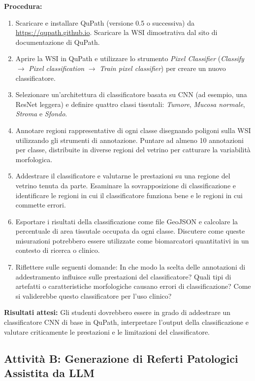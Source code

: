 \textbf{Procedura:}
\begin{enumerate}
  \item Scaricare e installare QuPath (versione 0.5 o successiva) da \url{https://qupath.github.io}. Scaricare la WSI dimostrativa dal sito di documentazione di QuPath.
  \item Aprire la WSI in QuPath e utilizzare lo strumento \textit{Pixel Classifier} (\textit{Classify} $\rightarrow$ \textit{Pixel classification} $\rightarrow$ \textit{Train pixel classifier}) per creare un nuovo classificatore.
  \item Selezionare un'architettura di classificatore basata su CNN (ad esempio, una ResNet leggera) e definire quattro classi tissutali: \textit{Tumore}, \textit{Mucosa normale}, \textit{Stroma} e \textit{Sfondo}.
  \item Annotare regioni rappresentative di ogni classe disegnando poligoni sulla WSI utilizzando gli strumenti di annotazione. Puntare ad almeno 10 annotazioni per classe, distribuite in diverse regioni del vetrino per catturare la variabilità morfologica.
  \item Addestrare il classificatore e valutarne le prestazioni su una regione del vetrino tenuta da parte. Esaminare la sovrapposizione di classificazione e identificare le regioni in cui il classificatore funziona bene e le regioni in cui commette errori.
  \item Esportare i risultati della classificazione come file GeoJSON e calcolare la percentuale di area tissutale occupata da ogni classe. Discutere come queste misurazioni potrebbero essere utilizzate come biomarcatori quantitativi in un contesto di ricerca o clinico.
  \item Riflettere sulle seguenti domande: In che modo la scelta delle annotazioni di addestramento influisce sulle prestazioni del classificatore? Quali tipi di artefatti o caratteristiche morfologiche causano errori di classificazione? Come si validerebbe questo classificatore per l'uso clinico?
\end{enumerate}

\textbf{Risultati attesi:} Gli studenti dovrebbero essere in grado di addestrare un classificatore CNN di base in QuPath, interpretare l'output della classificazione e valutare criticamente le prestazioni e le limitazioni del classificatore.

\subsection{Attività B: Generazione di Referti Patologici Assistita da LLM}

